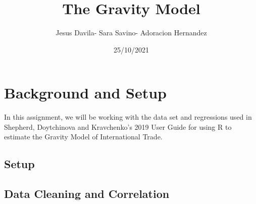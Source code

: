 \documentclass[
]{article}
\title{The Gravity Model}
\author{Jesus Davila- Sara Savino- Adoracion Hernandez}
\date{25/10/2021}
\newenvironment{Shaded}{\begin{snugshade}}{\end{snugshade}}
\newcommand{\AttributeTok}[1]{\textcolor[rgb]{0.77,0.63,0.00}{#1}}
\newcommand{\CommentTok}[1]{\textcolor[rgb]{0.56,0.35,0.01}{\textit{#1}}}
\newcommand{\ConstantTok}[1]{\textcolor[rgb]{0.00,0.00,0.00}{#1}}
\newcommand{\FunctionTok}[1]{\textcolor[rgb]{0.00,0.00,0.00}{#1}}
\newcommand{\NormalTok}[1]{#1}
\newcommand{\OtherTok}[1]{\textcolor[rgb]{0.56,0.35,0.01}{#1}}
\newcommand{\SpecialCharTok}[1]{\textcolor[rgb]{0.00,0.00,0.00}{#1}}
\newcommand{\StringTok}[1]{\textcolor[rgb]{0.31,0.60,0.02}{#1}}
\begin{document}
\maketitle

{
\setcounter{tocdepth}{3}
\tableofcontents
}
\hypertarget{background-and-setup}{%
\section{Background and Setup}\label{background-and-setup}}

In this assignment, we will be working with the data set and regressions
used in Shepherd, Doytchinova and Kravchenko's 2019 User Guide for using
R to estimate the Gravity Model of International Trade.

\hypertarget{setup}{%
\subsection{Setup}\label{setup}}

\begin{Shaded}
\end{Shaded}

\hypertarget{data-cleaning-and-correlation}{%
\subsection{Data Cleaning and
Correlation}\label{data-cleaning-and-correlation}}
\end{document}
